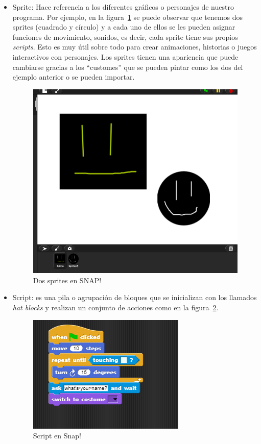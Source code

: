 \documentclass[a4paper, 12pt]{book}
\begin{document}
\begin{itemize}

	\item Sprite: Hace referencia a los diferentes gráficos o personajes de nuestro 		programa. Por ejemplo, en la figura~\ref{figura:sprites} se puede observar que tenemos 	dos sprites (cuadrado y círculo) y a cada uno de ellos se les pueden asignar funciones de 	movimiento, sonidos, es decir, cada sprite tiene sus propios \emph{scripts}. Esto es muy útil 	sobre todo para crear animaciones, historias o juegos interactivos con personajes. Los sprites tienen una apariencia que puede cambiarse gracias a los ``customes'' que se pueden pintar como los dos del ejemplo anterior o se pueden importar.

	    \begin{figure}[h]
		\centering
		\includegraphics[scale=0.3]{img/sprite.png}
		\caption{Dos sprites en SNAP!}
		\label{figura:sprites}
	    \end{figure}
	\item Script: es una pila o agrupación de bloques que se inicializan con los llamados 	\textit{hat blocks} y realizan un conjunto de acciones como en la 		figura~\ref{figura:script}. 
    
     \begin{figure}[h]
        \centering
        \includegraphics[scale=1]{img/script.PNG}
        \caption{Script en Snap!}
        \label{figura:script}
    \end{figure}
	    

\end{itemize}
\end{document}
